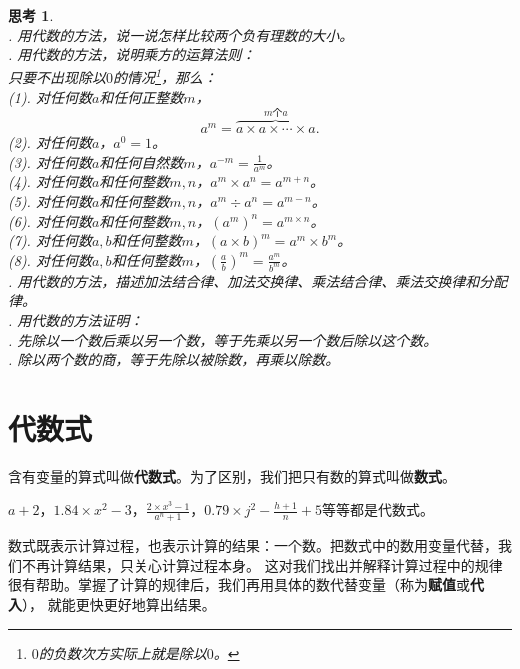 \documentclass[12pt,UTF8]{ctexbook}
\newtheorem{sk}{思考}[section]
\begin{document}
\begin{sk}\label{sk:1-0-0}
    \mbox{}\\
    . 用代数的方法，说一说怎样比较两个负有理数的大小。\\
    . 用代数的方法，说明乘方的运算法则：\\
    \indent \indent 只要不出现除以$0$的情况\footnote{$0$的负数次方实际上就是除以$0$。}，那么：\\
    \indent \indent (1). 对任何数$a$和任何正整数$m$，
    $$a^m = \overbrace{a\times a \times \cdots \times a}^{m\text{个}a}.$$
    \indent \indent (2). 对任何数$a$，$a^0 = 1$。\\
    \indent \indent (3). 对任何数$a$和任何自然数$m$，$a^{-m} = \frac{1}{a^m}$。\\
    \indent \indent (4). 对任何数$a$和任何整数$m,n$，$a^m \times a^n = a^{m+n}$。\\
    \indent \indent (5). 对任何数$a$和任何整数$m,n$，$a^m \div a^n = a^{m-n}$。\\
    \indent \indent (6). 对任何数$a$和任何整数$m,n$，$\left(a^m\right)^n = a^{m\times n}$。\\
    \indent \indent (7). 对任何数$a,b$和任何整数$m$，$(a\times b)^m = a^m \times b^m$。\\
    \indent \indent (8). 对任何数$a,b$和任何整数$m$，$\left(\frac{a}{b}\right)^m = \frac{a^m}{b^m}$。\\
    . 用代数的方法，描述加法结合律、加法交换律、乘法结合律、乘法交换律和分配律。\\
    . 用代数的方法证明：\\
    . 先除以一个数后乘以另一个数，等于先乘以另一个数后除以这个数。\\
    . 除以两个数的商，等于先除以被除数，再乘以除数。\\
\end{sk}

\section{代数式}
含有变量的算式叫做\textbf{代数式}。为了区别，我们把只有数的算式叫做\textbf{数式}。

$a + 2$，$1.84\times x^2 - 3$，$\frac{2\times x^3 - 1}{a^n + 1}$，$0.79\times  j^2 - \frac{h+1}{n} + 5 $等等都是代数式。

数式既表示计算过程，也表示计算的结果：一个数。把数式中的数用变量代替，我们不再计算结果，只关心计算过程本身。
这对我们找出并解释计算过程中的规律很有帮助。掌握了计算的规律后，我们再用具体的数代替变量（称为\textbf{赋值}或\textbf{代入}），
就能更快更好地算出结果。
\end{document}
